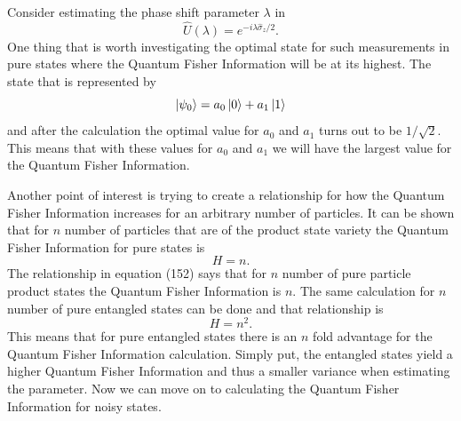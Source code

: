 \documentclass[twocolumn]{article}
\begin{document}
Consider estimating the phase shift parameter $\lambda$ in
\begin{equation}
\hat{U}(\lambda)=e^{-i\lambda\hat{\sigma}_z/2}.
\end{equation}
One thing that is worth investigating the optimal state for such measurements in pure states where the Quantum Fisher Information will be at its highest. The state that is represented by
\begin{equation}
\ket{\psi_0}=a_0\ket{0}+a_1\ket{1}
\end{equation}
and after the calculation the optimal value for $a_0$ and $a_1$ turns out to be $1/\sqrt{2}$. This means that with these values for $a_0$ and $a_1$ we will have the largest value for the Quantum Fisher Information.

Another point of interest is trying to create a relationship for how the Quantum Fisher Information increases for an arbitrary number of particles. It can be shown that for $n$ number of particles that are of the product state variety the Quantum Fisher Information for pure states is
\begin{equation}
H=n.
\end{equation}
The relationship in equation (152) says that for $n$ number of pure particle product states the Quantum Fisher Information is $n$. The same calculation for $n$ number of pure entangled states can be done and that relationship is
\begin{equation}
H=n^2.
\end{equation}
This means that for pure entangled states there is an $n$ fold advantage for the Quantum Fisher Information calculation. Simply put, the entangled states yield a higher Quantum Fisher Information and thus a smaller variance when estimating the parameter. Now we can move on to calculating the Quantum Fisher Information for noisy states.
\end{document}
